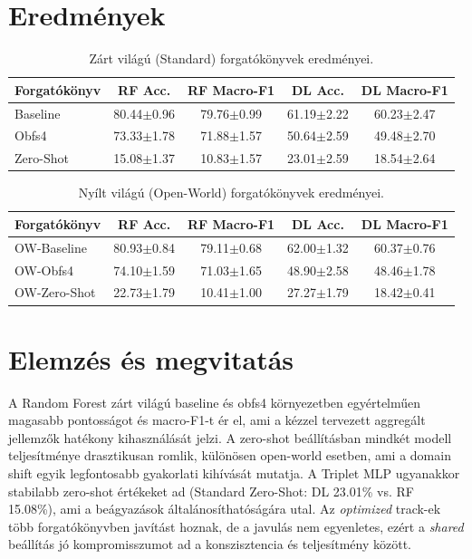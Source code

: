 \documentclass[a4paper,12pt]{article}
\begin{document}
\section{Eredmények}
\begin{table}[hbt!]
    \caption{Zárt világú (Standard) forgatókönyvek eredményei.}
    \vspace{2mm}
    \centering
    \begin{tabular}{lcccc}
        \toprule
        \textbf{Forgatókönyv} & \textbf{RF Acc.} & \textbf{RF Macro-F1} & \textbf{DL Acc.} & \textbf{DL Macro-F1} \\ \midrule
        Baseline & 80.44$\pm$0.96 & 79.76$\pm$0.99 & 61.19$\pm$2.22 & 60.23$\pm$2.47 \\
        Obfs4 & 73.33$\pm$1.78 & 71.88$\pm$1.57 & 50.64$\pm$2.59 & 49.48$\pm$2.70 \\
        Zero-Shot & 15.08$\pm$1.37 & 10.83$\pm$1.57 & 23.01$\pm$2.59 & 18.54$\pm$2.64 \\
        \bottomrule
    \end{tabular}
\end{table}

\begin{table}[hbt!]
    \caption{Nyílt világú (Open-World) forgatókönyvek eredményei.}
    \vspace{2mm}
    \centering
    \begin{tabular}{lcccc}
        \toprule
        \textbf{Forgatókönyv} & \textbf{RF Acc.} & \textbf{RF Macro-F1} & \textbf{DL Acc.} & \textbf{DL Macro-F1} \\ \midrule
        OW-Baseline & 80.93$\pm$0.84 & 79.11$\pm$0.68 & 62.00$\pm$1.32 & 60.37$\pm$0.76 \\
        OW-Obfs4 & 74.10$\pm$1.59 & 71.03$\pm$1.65 & 48.90$\pm$2.58 & 48.46$\pm$1.78 \\
        OW-Zero-Shot & 22.73$\pm$1.79 & 10.41$\pm$1.00 & 27.27$\pm$1.79 & 18.42$\pm$0.41 \\
        \bottomrule
    \end{tabular}
\end{table}

\section{Elemzés és megvitatás}
A Random Forest zárt világú baseline és obfs4 környezetben egyértelműen magasabb
pontosságot és macro-F1-t ér el, ami a kézzel tervezett aggregált jellemzők hatékony
kihasználását jelzi. A zero-shot beállításban mindkét modell teljesítménye drasztikusan
romlik, különösen open-world esetben, ami a domain shift egyik legfontosabb gyakorlati
kihívását mutatja. A Triplet MLP ugyanakkor stabilabb zero-shot értékeket ad (Standard Zero-Shot:
DL 23.01\% vs. RF 15.08\%), ami a beágyazások általánosíthatóságára utal.
Az \textit{optimized} track-ek több forgatókönyvben javítást hoznak, de a javulás nem
egyenletes, ezért a \textit{shared} beállítás jó kompromisszumot ad a konszisztencia és
teljesítmény között.
\end{document}
